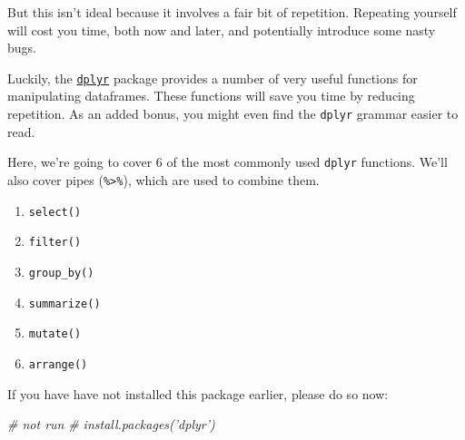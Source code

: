\documentclass[]{book}
\newenvironment{Shaded}{\begin{snugshade}}{\end{snugshade}}
\newcommand{\KeywordTok}[1]{\textcolor[rgb]{0.13,0.29,0.53}{\textbf{#1}}}
\newcommand{\StringTok}[1]{\textcolor[rgb]{0.31,0.60,0.02}{#1}}
\newcommand{\CommentTok}[1]{\textcolor[rgb]{0.56,0.35,0.01}{\textit{#1}}}
\newcommand{\OperatorTok}[1]{\textcolor[rgb]{0.81,0.36,0.00}{\textbf{#1}}}
\newcommand{\NormalTok}[1]{#1}
\providecommand{\tightlist}{%
  \setlength{\itemsep}{0pt}\setlength{\parskip}{0pt}}
\begin{document}
\begin{Shaded}
\end{Shaded}

But this isn't ideal because it involves a fair bit of repetition.
Repeating yourself will cost you time, both now and later, and
potentially introduce some nasty bugs.

Luckily, the
\href{https://cran.r-project.org/web/packages/dplyr/dplyr.pdf}{\texttt{dplyr}}
package provides a number of very useful functions for manipulating
dataframes. These functions will save you time by reducing repetition.
As an added bonus, you might even find the \texttt{dplyr} grammar easier
to read.

Here, we're going to cover 6 of the most commonly used \texttt{dplyr}
functions. We'll also cover pipes (\texttt{\%\textgreater{}\%}), which
are used to combine them.

\begin{enumerate}
\def\labelenumi{\arabic{enumi}.}
\tightlist
\item
  \texttt{select()}
\item
  \texttt{filter()}
\item
  \texttt{group\_by()}
\item
  \texttt{summarize()}
\item
  \texttt{mutate()}
\item
  \texttt{arrange()}
\end{enumerate}

If you have have not installed this package earlier, please do so now:

\begin{Shaded}
\begin{Highlighting}[]
\CommentTok{# not run}
\CommentTok{# install.packages('dplyr')}
\end{Highlighting}
\end{Shaded}
\end{document}
